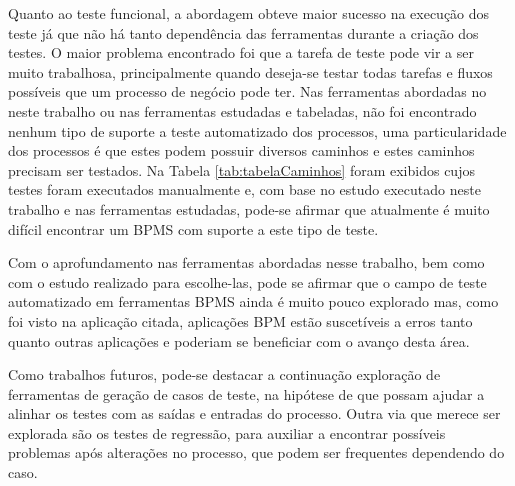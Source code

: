 \documentclass[12pt]{article}
\begin{document}
Quanto ao teste funcional, a abordagem obteve maior sucesso na execução dos teste já que não há tanto dependência das ferramentas durante a criação dos testes. O maior problema encontrado foi que a tarefa de teste pode vir a ser muito trabalhosa, principalmente quando deseja-se testar todas tarefas e fluxos possíveis que um processo de negócio pode ter.
Nas ferramentas abordadas no neste trabalho ou nas ferramentas estudadas e tabeladas, não foi encontrado nenhum tipo de suporte a teste automatizado dos processos, uma particularidade dos processos é que estes podem possuir diversos caminhos e estes caminhos precisam ser testados. Na Tabela \ref{tab:tabelaCaminhos} foram exibidos cujos testes foram executados manualmente e, com base no estudo executado neste trabalho e nas ferramentas estudadas, pode-se afirmar que atualmente é muito difícil encontrar um BPMS com suporte a este tipo de teste.

Com o aprofundamento nas ferramentas abordadas nesse trabalho, bem como com o estudo realizado para escolhe-las, pode se afirmar que o campo de teste automatizado em ferramentas BPMS ainda é muito pouco explorado mas, como foi visto na aplicação citada, aplicações BPM estão suscetíveis a erros tanto quanto outras aplicações e poderiam se beneficiar com o avanço desta área.

Como trabalhos futuros, pode-se destacar a continuação exploração de ferramentas de geração de casos de teste, na hipótese de que possam ajudar a alinhar os testes com as saídas e entradas do processo. Outra via que merece ser explorada são os testes de regressão, para auxiliar a encontrar possíveis problemas após alterações no processo, que podem ser frequentes dependendo do caso.




\end{document}
